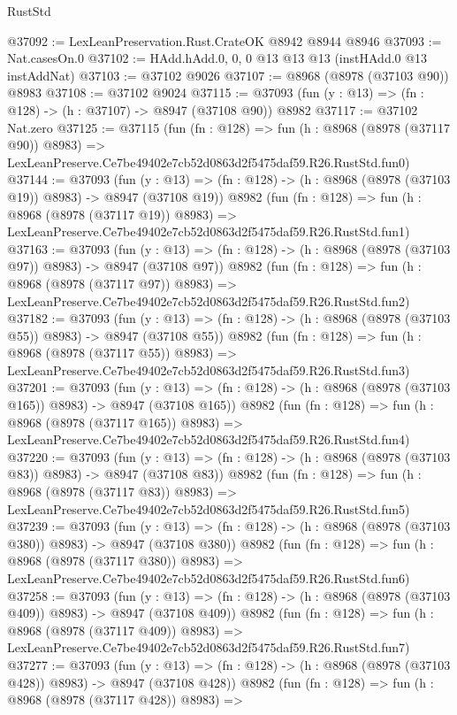 \begin{lexlean}{RustStd}
\begin{coremodule}
@37092 := LexLeanPreservation.Rust.CrateOK @8942 @8944 @8946
@37093 := Nat.casesOn.{0}
@37102 := HAdd.hAdd.{0, 0, 0} @13 @13 @13 (instHAdd.{0} @13 instAddNat)
@37103 := @37102 @9026
@37107 := @8968 (@8978 (@37103 @90)) @8983
@37108 := @37102 @9024
@37115 := @37093 (fun (y : @13) => (fn : @128) -> (h : @37107) -> @8947 (@37108 @90)) @8982
@37117 := @37102 Nat.zero
@37125 := @37115
    (fun (fn : @128) =>
    fun (h : @8968 (@8978 (@37117 @90)) @8983) =>
    LexLeanPreserve.Ce7be49402e7cb52d0863d2f5475daf59.R26.RustStd.fun0)
@37144 := @37093
    (fun (y : @13) => (fn : @128) -> (h : @8968 (@8978 (@37103 @19)) @8983) -> @8947 (@37108 @19))
    @8982
    (fun (fn : @128) =>
    fun (h : @8968 (@8978 (@37117 @19)) @8983) =>
    LexLeanPreserve.Ce7be49402e7cb52d0863d2f5475daf59.R26.RustStd.fun1)
@37163 := @37093
    (fun (y : @13) => (fn : @128) -> (h : @8968 (@8978 (@37103 @97)) @8983) -> @8947 (@37108 @97))
    @8982
    (fun (fn : @128) =>
    fun (h : @8968 (@8978 (@37117 @97)) @8983) =>
    LexLeanPreserve.Ce7be49402e7cb52d0863d2f5475daf59.R26.RustStd.fun2)
@37182 := @37093
    (fun (y : @13) => (fn : @128) -> (h : @8968 (@8978 (@37103 @55)) @8983) -> @8947 (@37108 @55))
    @8982
    (fun (fn : @128) =>
    fun (h : @8968 (@8978 (@37117 @55)) @8983) =>
    LexLeanPreserve.Ce7be49402e7cb52d0863d2f5475daf59.R26.RustStd.fun3)
@37201 := @37093
    (fun (y : @13) => (fn : @128) -> (h : @8968 (@8978 (@37103 @165)) @8983) -> @8947 (@37108 @165))
    @8982
    (fun (fn : @128) =>
    fun (h : @8968 (@8978 (@37117 @165)) @8983) =>
    LexLeanPreserve.Ce7be49402e7cb52d0863d2f5475daf59.R26.RustStd.fun4)
@37220 := @37093
    (fun (y : @13) => (fn : @128) -> (h : @8968 (@8978 (@37103 @83)) @8983) -> @8947 (@37108 @83))
    @8982
    (fun (fn : @128) =>
    fun (h : @8968 (@8978 (@37117 @83)) @8983) =>
    LexLeanPreserve.Ce7be49402e7cb52d0863d2f5475daf59.R26.RustStd.fun5)
@37239 := @37093
    (fun (y : @13) => (fn : @128) -> (h : @8968 (@8978 (@37103 @380)) @8983) -> @8947 (@37108 @380))
    @8982
    (fun (fn : @128) =>
    fun (h : @8968 (@8978 (@37117 @380)) @8983) =>
    LexLeanPreserve.Ce7be49402e7cb52d0863d2f5475daf59.R26.RustStd.fun6)
@37258 := @37093
    (fun (y : @13) => (fn : @128) -> (h : @8968 (@8978 (@37103 @409)) @8983) -> @8947 (@37108 @409))
    @8982
    (fun (fn : @128) =>
    fun (h : @8968 (@8978 (@37117 @409)) @8983) =>
    LexLeanPreserve.Ce7be49402e7cb52d0863d2f5475daf59.R26.RustStd.fun7)
@37277 := @37093
    (fun (y : @13) => (fn : @128) -> (h : @8968 (@8978 (@37103 @428)) @8983) -> @8947 (@37108 @428))
    @8982
    (fun (fn : @128) =>
    fun (h : @8968 (@8978 (@37117 @428)) @8983) =>

\end{coremodule}
\end{lexlean}
